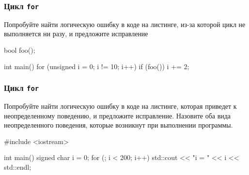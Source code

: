 \documentclass[compress, 8pt, aspectratio=169]{beamer}
\begin{document}
\begin{frame}[fragile]

    \frametitle{Цикл \texttt{for}}

    \begin{task}
        Попробуйте найти логическую ошибку в коде на листинге,
        из-за которой цикл не выполняется ни разу, и предложите
        исправление
    \end{task}

    \begin{myinplacelisting}[minted language=cpp]
bool foo();

int main() {
    for (unsigned i = 0; i != 10; i++) {
        if (foo()) {
            i += 2;
        }
    }
}
    \end{myinplacelisting}

\end{frame}

\begin{frame}[fragile]

    \frametitle{Цикл \texttt{for}}

    \begin{task}
        Попробуйте найти логическую ошибку в коде на листинге,
        которая приведет к неопределенному поведению, и предложите
        исправление.
        Назовите оба вида неопределенного поведения, которые возникнут
        при выполнении программы.
    \end{task}

    \begin{myinplacelisting}[minted language=cpp]
#include <iostream>

int main() {
    signed char i = 0;
    for (; i < 200; i++) {
        std::cout << "i = " << i << std::endl;
    }
}
    \end{myinplacelisting}

\end{frame}
\end{document}
